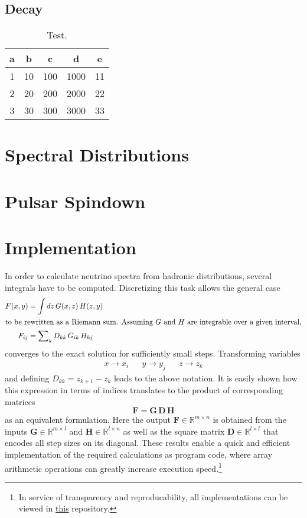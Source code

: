\subsection*{Decay}

\begin{table}
	\centering
	\caption{Test.}
	\label{tab:test}
	\begin{tabular}{c c c c c}
		\toprule
		a & b & c & d & e \\
		\midrule
		1 & 10 & 100 & 1000 & 11 \\
		2 & 20 & 200 & 2000 & 22 \\
		3 & 30 & 300 & 3000 & 33 \\
		\bottomrule
	\end{tabular}
\end{table}

\section{Spectral Distributions}
\label{sec:spectral}

\section{Pulsar Spindown}
\label{sec:spindown}

\section{Implementation}
\label{sec:implementation}

In order to calculate neutrino spectra from hadronic distributions, several integrals have to be computed. Discretizing
this task allows the general case
\begin{align*}
	F(x, y) &= \int dz \, G(x, z) \, H(z, y) \\
	\intertext{to be rewritten as a Riemann sum. Assuming $G$ and $H$ are integrable over a given interval,}
	F_{ij} &= \sum\nolimits_k D_{kk} \, G_{ik} \, H_{kj}
\end{align*}
converges to the exact solution for sufficiently small steps. Transforming variables
\begin{align*}
	&&&& x \rightarrow x_i && y \rightarrow y_j && z \rightarrow z_k &&&&
\end{align*}
and defining $D_{kk} = z_{k+1} - z_k$ leads to the above notation. It is easily shown how this expression in terms of
indices translates to the product of corresponding matrices
\begin{equation*}
	\bm{F} = \bm{G} \, \bm{D} \, \bm{H}
\end{equation*}
as an equivalent formulation. Here the output $\bm{F} \in \mathbb{R}^{m \times n}$ is obtained from the inputs
$\bm{G} \in \mathbb{R}^{m \times l}$ and $\bm{H} \in \mathbb{R}^{l \times n}$ as well as the square matrix
$\bm{D} \in \mathbb{R}^{l \times l}$ that encodes all step sizes on its diagonal. These results enable a quick and
efficient implementation of the required calculations as program code, where array arithmetic operations can greatly
increase execution speed.\footnote{In service of transparency and reproducability, all implementations can be viewed
in \href{https://github.com/fritzali/bachelor}{this} repository.}

